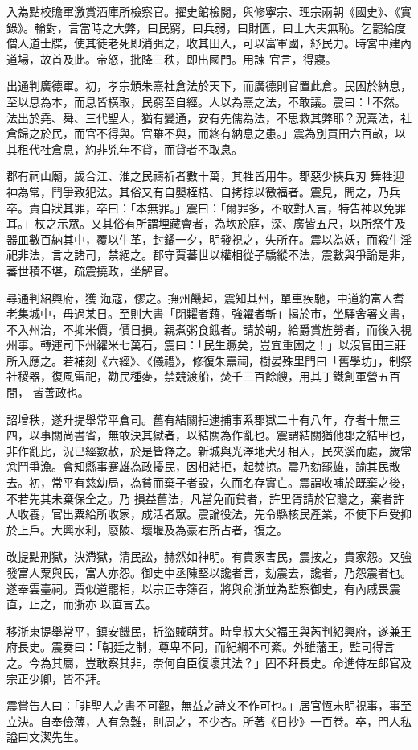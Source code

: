 \begin{pinyinscope}
 入為點校贍軍激賞酒庫所檢察官。擢史館檢閱，與修寧宗、理宗兩朝《國史》、《實錄》。輪對，言當時之大弊，曰民窮，曰兵弱，曰財匱，曰士大夫無恥。乞罷給度僧人道士牒，使其徒老死即消弭之，收其田入，可以富軍國，紓民力。時宮中建內道場，故首及此。帝怒，批降三秩，即出國門。用諫
 官言，得寢。



 出通判廣德軍。初，孝宗頒朱熹社倉法於天下，而廣德則官置此倉。民困於納息，至以息為本，而息皆橫取，民窮至自經。人以為熹之法，不敢議。震曰：「不然。法出於堯、舜、三代聖人，猶有變通，安有先儒為法，不思救其弊耶？況熹法，社倉歸之於民，而官不得與。官雖不與，而終有納息之患。」震為別買田六百畝，以其租代社倉息，約非兇年不貸，而貸者不取息。



 郡有祠山廟，歲合江、淮之民禱祈者數十萬，其牲皆用牛。郡惡少挾兵刃
 舞牲迎神為常，鬥爭致犯法。其俗又有自嬰桎梏、自拷掠以徼福者。震見，問之，乃兵卒。責自狀其罪，卒曰：「本無罪。」震曰：「爾罪多，不敢對人言，特告神以免罪耳。」杖之示眾。又其俗有所謂埋藏會者，為坎於庭，深、廣皆五尺，以所祭牛及器皿數百納其中，覆以牛革，封鐍一夕，明發視之，失所在。震以為妖，而殺牛淫祀非法，言之諸司，禁絕之。郡守賈蕃世以權相從子驕縱不法，震數與爭論是非，蕃世積不堪，疏震撓政，坐解官。



 尋通判紹興府，獲
 海寇，僇之。撫州饑起，震知其州，單車疾馳，中道約富人耆老集城中，毋過某日。至則大書「閉糶者藉，強糴者斬」揭於市，坐驛舍署文書，不入州治，不抑米價，價日損。親煮粥食餓者。請於朝，給爵賞旌勞者，而後入視州事。轉運司下州糴米七萬石，震曰：「民生蹶矣，豈宜重困之！」以沒官田三莊所入應之。若補刻《六經》、《儀禮》，修復朱熹祠，樹晏殊里門曰「舊學坊」，制祭社稷器，復風雷祀，勸民種麥，禁競渡船，焚千三百餘艘，用其丁鐵創軍營五百間，
 皆善政也。



 詔增秩，遂升提舉常平倉司。舊有結關拒逮捕事系郡獄二十有八年，存者十無三四，以事關尚書省，無敢決其獄者，以結關為作亂也。震謂結關猶他郡之結甲也，非作亂比，況已經數赦，於是皆釋之。新城與光澤地犬牙相入，民夾溪而處，歲常忿鬥爭漁。會知縣事蹇雄為政擾民，因相結拒，起焚掠。震乃劾罷雄，諭其民散去。初，常平有慈幼局，為貧而棄子者設，久而名存實亡。震謂收哺於既棄之後，不若先其未棄保全之。乃
 損益舊法，凡當免而貧者，許里胥請於官贍之，棄者許人收養，官出粟給所收家，成活者眾。震論役法，先令縣核民產業，不使下戶受抑於上戶。大興水利，廢陂、壞堰及為豪右所占者，復之。



 改提點刑獄，決滯獄，清民訟，赫然如神明。有貴家害民，震按之，貴家怨。又強發富人粟與民，富人亦怨。御史中丞陳堅以讒者言，劾震去，讒者，乃怨震者也。遂奉雲臺祠。賈似道罷相，以宗正寺簿召，將與俞浙並為監察御史，有內戚畏震直，止之，而浙亦
 以直言去。



 移浙東提舉常平，鎮安饑民，折盜賊萌芽。時皇叔大父福王與芮判紹興府，遂兼王府長史。震奏曰：「朝廷之制，尊卑不同，而紀綱不可紊。外雖藩王，監司得言之。今為其屬，豈敢察其非，奈何自臣復壞其法？」固不拜長史。命進侍左郎官及宗正少卿，皆不拜。



 震嘗告人曰：「非聖人之書不可觀，無益之詩文不作可也。」居官恆未明視事，事至立決。自奉儉薄，人有急難，則周之，不少吝。所著《日抄》一百卷。卒，門人私謚曰文潔先生。



\end{pinyinscope}